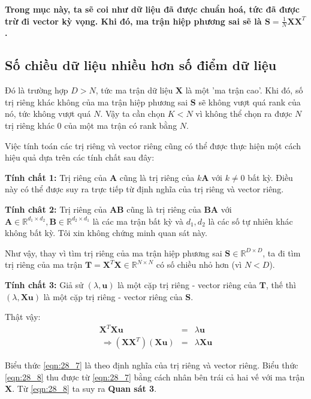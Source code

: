 \textbf{Trong mục này, ta sẽ coi như dữ liệu đã được chuẩn hoá, tức đã được trừ đi vector kỳ vọng. Khi đó, ma trận hiệp phương sai sẽ là $\mathbf{S} = \frac{1}{N}\mathbf{X}\mathbf{X}^T$.} 
 
\subsection{Số chiều dữ liệu nhiều hơn số điểm dữ liệu}
 
Đó là trường hợp $D > N$, tức ma trận dữ liệu $\mathbf{X}$ là một 'ma trận cao'. Khi đó, số trị riêng khác không của ma trận hiệp phương sai $\mathbf{S}$ sẽ không vượt quá rank của nó, tức không vượt quá $N$. Vậy ta cần chọn $K < N$ vì không thể chọn ra được $N$ trị riêng khác 0 của một ma trận có rank bằng $N$. 
 
Việc tính toán các trị riêng và vector riêng cũng có thể được thực hiện một cách hiệu quả dựa trên các tính chất sau đây: 

\textbf{Tính chất 1:} Trị riêng của $\mathbf{A}$ cũng là trị riêng của $k\mathbf{A}$ với $k \neq 0$ bất kỳ. Điều này có thể được suy ra trực tiếp từ định nghĩa của trị riêng và vector riêng. 
 
\textbf{Tính chât 2:} Trị riêng của $\mathbf{AB}$ cũng là trị riêng của $\mathbf{BA}$ với $\mathbf{A} \in \mathbb{R}^{d_1 \times d_2}, \mathbf{B} \in \mathbb{R} ^{d_2 \times d_1}$ là các ma trận bất kỳ và $d_1, d_2$ là các số tự nhiên khác không bất kỳ. Tôi xin không chứng minh quan sát này. 
 
Như vậy, thay vì tìm trị riêng của ma trận hiệp phương sai $\mathbf{S} \in \mathbb{R}^{D\times D}$, ta đi tìm trị riêng của ma trận $\mathbf{T} = \mathbf{X}^T \mathbf{X} \in \mathbb{R}^{N \times N}$ có số chiều nhỏ hơn (vì $N < D$). 
 
\textbf{Tính chất 3:} Giả sử $(\lambda, \mathbf{u})$ là một cặp trị riêng - vector riêng của $\mathbf{T}$, thế thì $(\lambda, \mathbf{Xu})$ là một cặp trị riêng - vector riêng của $\mathbf{S}$. 
 
Thật vậy: 
\begin{eqnarray} 
  \label{eqn:28_7}
  \mathbf{X}^T \mathbf{Xu} &=& \lambda \mathbf{u} \\\ 
  \label{eqn:28_8}
  \Rightarrow (\mathbf{X}\mathbf{X}^T)(\mathbf{Xu}) &=& \lambda \mathbf{Xu}  
\end{eqnarray} 
 
Biểu thức \eqref{eqn:28_7} là theo định nghĩa của trị riêng và vector riêng. Biểu thức \eqref{eqn:28_8} thu được từ \eqref{eqn:28_7} bằng cách nhân bên trái cả hai vế với ma trận $\mathbf{X}$. Từ \eqref{eqn:28_8} ta suy ra \textbf{Quan sát 3}. 
 
